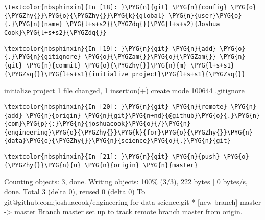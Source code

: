 \documentclass[letterpaper,10pt,english]{sphinxmanual}
\begin{document}
%
\begin{Verbatim}[commandchars=\\\{\}]
\textcolor{nbsphinxin}{In [18]: }\PYG{n}{git} \PYG{n}{config} \PYG{o}{\PYGZhy{}}\PYG{o}{\PYGZhy{}}\PYG{k}{global} \PYG{n}{user}\PYG{o}{.}\PYG{n}{name} \PYG{l+s+s2}{\PYGZdq{}}\PYG{l+s+s2}{Joshua Cook}\PYG{l+s+s2}{\PYGZdq{}}
\end{Verbatim}

%
\begin{Verbatim}[commandchars=\\\{\}]
\textcolor{nbsphinxin}{In [19]: }\PYG{n}{git} \PYG{n}{add} \PYG{o}{.}\PYG{n}{gitignore} \PYG{o}{\PYGZam{}}\PYG{o}{\PYGZam{}} \PYG{n}{git} \PYG{n}{commit} \PYG{o}{\PYGZhy{}}\PYG{n}{m} \PYG{l+s+s1}{\PYGZsq{}}\PYG{l+s+s1}{initialize project}\PYG{l+s+s1}{\PYGZsq{}}
\end{Verbatim}



%
\begin{OriginalVerbatim} initialize project
 1 file changed, 1 insertion(+)
 create mode 100644 .gitignore
\end{OriginalVerbatim}
\relax

%
\begin{Verbatim}[commandchars=\\\{\}]
\textcolor{nbsphinxin}{In [20]: }\PYG{n}{git} \PYG{n}{remote} \PYG{n}{add} \PYG{n}{origin} \PYG{n}{git}\PYG{n+nd}{@github}\PYG{o}{.}\PYG{n}{com}\PYG{p}{:}\PYG{n}{joshuacook}\PYG{o}{/}\PYG{n}{engineering}\PYG{o}{\PYGZhy{}}\PYG{k}{for}\PYG{o}{\PYGZhy{}}\PYG{n}{data}\PYG{o}{\PYGZhy{}}\PYG{n}{science}\PYG{o}{.}\PYG{n}{git}
\end{Verbatim}

%
\begin{Verbatim}[commandchars=\\\{\}]
\textcolor{nbsphinxin}{In [21]: }\PYG{n}{git} \PYG{n}{push} \PYG{o}{\PYGZhy{}}\PYG{n}{u} \PYG{n}{origin} \PYG{n}{master}
\end{Verbatim}



%
\begin{OriginalVerbatim}[commandchars=\\\{\}]
Counting objects: 3, done.
Writing objects: 100\% (3/3), 222 bytes | 0 bytes/s, done.
Total 3 (delta 0), reused 0 (delta 0)
To git@github.com:joshuacook/engineering-for-data-science.git
 * [new branch]      master -> master
Branch master set up to track remote branch master from origin.
\end{OriginalVerbatim}
\relax
\end{document}
